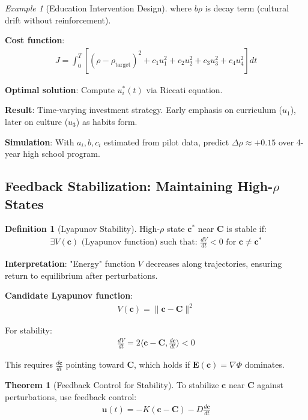 \documentclass[11pt,a4paper]{article}
\theoremstyle{definition}
\newtheorem{definition}{Definition}[section]
\newtheorem{theorem}{Theorem}[section]
\theoremstyle{remark}
\newtheorem{example}{Example}[section]
\newcommand{\EE}{\mathbf{E}}
\newcommand{\cc}{\mathbf{c}}
\begin{document}
\begin{small}
\begin{enumerate}
\begin{example}[Education Intervention Design]
where \(b\rho\) is decay term (cultural drift without reinforcement).

\textbf{Cost function}:
\begin{align}
J = \int_0^T \left[(\rho - \rho_{\text{target}})^2 + c_1 u_1^2 + c_2 u_2^2 + c_3 u_3^2 + c_4 u_4^2\right] dt
\end{align}

\textbf{Optimal solution}: Compute \(u_i^*(t)\) via Riccati equation.

\textbf{Result}: Time-varying investment strategy. Early emphasis on curriculum (\(u_1\)), later on culture (\(u_3\)) as habits form.

\textbf{Simulation}: With \(a_i, b, c_i\) estimated from pilot data, predict \(\Delta\rho \approx +0.15\) over 4-year high school program.
\end{example}

\subsection{Feedback Stabilization: Maintaining High-\(\rho\) States}

\begin{definition}[Lyapunov Stability]
High-\(\rho\) state \(\cc^*\) near \(\mathbf{C}\) is stable if:
\begin{align}
\exists V(\cc) \text{ (Lyapunov function) such that: } \frac{dV}{dt} < 0 \text{ for } \cc \neq \cc^*
\end{align}

\textbf{Interpretation}: "Energy" function \(V\) decreases along trajectories, ensuring return to equilibrium after perturbations.

\textbf{Candidate Lyapunov function}:
\begin{align}
V(\cc) = \|\cc - \mathbf{C}\|^2
\end{align}

For stability:
\begin{align}
\frac{dV}{dt} = 2\langle \cc - \mathbf{C}, \frac{d\cc}{dt} \rangle < 0
\end{align}

This requires \(\frac{d\cc}{dt}\) pointing toward \(\mathbf{C}\), which holds if \(\EE(\cc) = \nabla \Phi\) dominates.
\end{definition}

\begin{theorem}[Feedback Control for Stability]
To stabilize \(\cc\) near \(\mathbf{C}\) against perturbations, use feedback control:
\begin{align}
\mathbf{u}(t) = -K(\cc - \mathbf{C}) - D\frac{d\cc}{dt}
\end{align}


\end{theorem}
\end{enumerate}
\end{small}
\end{document}
